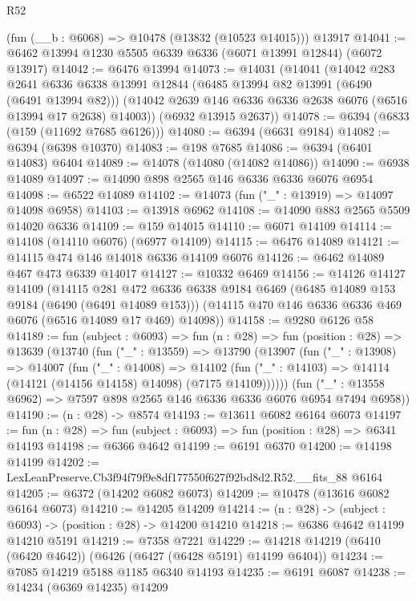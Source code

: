 \begin{lexlean}{R52}
\begin{coremodule}
    (fun (__b : @6068) => @10478 (@13832 (@10523 @14015)))
    @13917
@14041 := @6462 @13994 @1230 @5505 @6339 @6336 (@6071 @13991 @12844) (@6072 @13917)
@14042 := @6476 @13994
@14073 := @14031
    (@14041
      (@14042
        @283
        @2641
        @6336
        @6338
        @13991
        @12844
        (@6485 @13994 @82 @13991 (@6490 (@6491 @13994 @82)))
        (@14042 @2639 @146 @6336 @6336 @2638 @6076 (@6516 @13994 @17 @2638) @14003))
      (@6932 @13915 @2637))
@14078 := @6394 (@6833 (@159 (@11692 @7685 @6126)))
@14080 := @6394 (@6631 @9184)
@14082 := @6394 (@6398 @10370)
@14083 := @198 @7685
@14086 := @6394 (@6401 @14083) @6404
@14089 := @14078 (@14080 (@14082 @14086))
@14090 := @6938 @14089
@14097 := @14090 @898 @2565 @146 @6336 @6336 @6076 @6954
@14098 := @6522 @14089
@14102 := @14073 (fun ("_" : @13919) => @14097 @14098 @6958)
@14103 := @13918 @6962
@14108 := @14090 @883 @2565 @5509 @14020 @6336
@14109 := @159 @14015
@14110 := @6071 @14109
@14114 := @14108 (@14110 @6076) (@6977 @14109)
@14115 := @6476 @14089
@14121 := @14115 @474 @146 @14018 @6336 @14109 @6076
@14126 := @6462 @14089 @467 @473 @6339 @14017
@14127 := @10332 @6469
@14156 := @14126
    @14127
    @14109
    (@14115
      @281
      @472
      @6336
      @6338
      @9184
      @6469
      (@6485 @14089 @153 @9184 (@6490 (@6491 @14089 @153)))
      (@14115 @470 @146 @6336 @6336 @469 @6076 (@6516 @14089 @17 @469) @14098))
@14158 := @9280 @6126 @58
@14189 := fun (subject : @6093) =>
  fun (n : @28) =>
  fun (position : @28) =>
  @13639
    (@13740
      (fun ("_" : @13559) =>
      @13790
        (@13907
          (fun ("_" : @13908) =>
          @14007
            (fun ("_" : @14008) =>
            @14102 (fun ("_" : @14103) => @14114 (@14121 (@14156 @14158) @14098) (@7175 @14109))))))
      (fun ("_" : @13558 @6962) => @7597 @898 @2565 @146 @6336 @6336 @6076 @6954 @7494 @6958))
@14190 := (n : @28) -> @8574
@14193 := @13611 @6082 @6164 @6073
@14197 := fun (n : @28) => fun (subject : @6093) => fun (position : @28) => @6341 @14193
@14198 := @6366 @4642
@14199 := @6191 @6370
@14200 := @14198 @14199
@14202 := LexLeanPreserve.Cb3f94f79f9e8df177550f627f92bd8d2.R52.__fits_88 @6164
@14205 := @6372 (@14202 @6082 @6073)
@14209 := @10478 (@13616 @6082 @6164 @6073)
@14210 := @14205 @14209
@14214 := (n : @28) -> (subject : @6093) -> (position : @28) -> @14200 @14210
@14218 := @6386 @4642 @14199 @14210 @5191
@14219 := @7358 @7221
@14229 := @14218 @14219 (@6410 (@6420 @4642)) (@6426 (@6427 (@6428 @5191) @14199 @6404))
@14234 := @7085 @14219 @5188 @1185 @6340 @14193
@14235 := @6191 @6087
@14238 := @14234 (@6369 @14235) @14209

\end{coremodule}
\end{lexlean}
